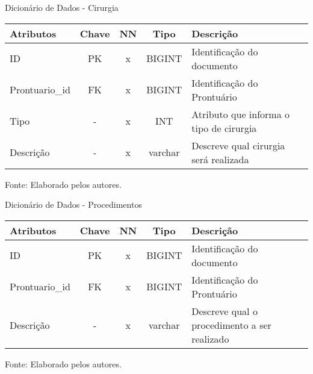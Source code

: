 \documentclass[
    12pt,               %
    openright,          %
    oneside,
    a4paper,            %
    BIBLATEX,           %
    TODO,               %
    english,            %
    brazil              %
    ]{ifsp-spo-inf-ctds}
\begin{document}
\begin{center}
                        \begin{quadro}[H]
                        \centering
                            \caption{Dicionário de Dados - Cirurgia}
                            \begin{tabulary}{1.0\textwidth}{|p{9em}|c|c|c|p{19em}|}
                          \hline
                          Atributos & Chave & NN & Tipo & Descrição\\
                          \hline
                          ID & PK & x & BIGINT & Identificação do documento \\
                          \hline
                          Prontuario\_id & FK & x & BIGINT & Identificação do Prontuário \\
                          \hline
                          Tipo & - & x & INT & Atributo que informa o tipo de cirurgia \\
                          \hline
                          Descrição & - & x & varchar & Descreve qual cirurgia será realizada\\
                          \hline
                          \end{tabulary}

                            \label{qd: md-cirurgia}
                            \centering
                          {\footnotesize Fonte: Elaborado pelos autores.}
                        \end{quadro}
                      \end{center} 


\begin{center}
                        \begin{quadro}[H]
                        \centering
                            \caption{Dicionário de Dados - Procedimentos}
                            \begin{tabulary}{1.0\textwidth}{|p{9em}|c|c|c|p{19em}|}
                          \hline
                          Atributos & Chave & NN & Tipo & Descrição\\
                          \hline
                          ID & PK & x & BIGINT & Identificação do documento \\
                          \hline
                          Prontuario\_id & FK & x & BIGINT & Identificação do Prontuário \\
                          \hline
                          Descrição & - & x & varchar & Descreve qual o procedimento a ser realizado\\
                          \hline
                          \end{tabulary}

                            \label{qd: md-procedimento}
                            \centering
                          {\footnotesize Fonte: Elaborado pelos autores.}
                        \end{quadro}
                      \end{center} 
\end{document}
